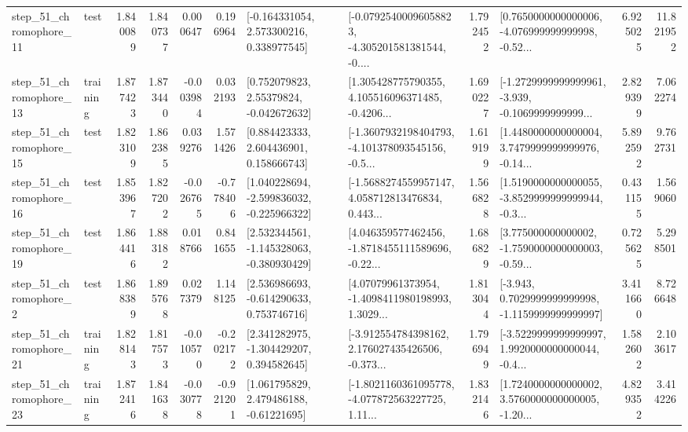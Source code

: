 \begin{tabular}{llrrrrllrlrr}
   step\_51\_chromophore\_11 &      test &      1.840089 &    1.840737 &      0.000647 &  0.196964 &    [-0.164331054, 2.573300216, 0.338977545] &  [-0.07925400096058823, -4.305201581381544, -0.... &       1.792452 &  [0.7650000000000006, -4.076999999999998, -0.52... &            6.925025 &         11.821952 \\
   step\_51\_chromophore\_13 &  training &      1.877423 &    1.873440 &     -0.003984 &  0.032193 &     [0.752079823, 2.55379824, -0.042672632] &  [1.305428775790355, 4.105516096371485, -0.4206... &       1.690227 &  [-1.2729999999999961, -3.939, -0.1069999999999... &            2.829399 &          7.062274 \\
   step\_51\_chromophore\_15 &      test &      1.823109 &    1.862385 &      0.039276 &  1.571426 &     [0.884423333, 2.604436901, 0.158666743] &  [-1.3607932198404793, -4.101378093545156, -0.5... &       1.619199 &  [1.4480000000000004, 3.7479999999999976, -0.14... &            5.892592 &          9.762731 \\
   step\_51\_chromophore\_16 &      test &      1.853967 &    1.827202 &     -0.026765 & -0.778406 &   [1.040228694, -2.599836032, -0.225966322] &  [-1.5688274559957147, 4.058712813476834, 0.443... &       1.566828 &  [1.5190000000000055, -3.8529999999999944, -0.3... &            0.431155 &          1.569060 \\
   step\_51\_chromophore\_19 &      test &      1.864416 &    1.883182 &      0.018766 &  0.841655 &   [2.532344561, -1.145328063, -0.380930429] &  [4.046359577462456, -1.8718455111589696, -0.22... &       1.686829 &  [3.775000000000002, -1.7590000000000003, -0.59... &            0.725625 &          5.298501 \\
    step\_51\_chromophore\_2 &      test &      1.868389 &    1.895768 &      0.027379 &  1.148125 &    [2.536986693, -0.614290633, 0.753746716] &  [4.07079961373954, -1.4098411980198993, 1.3029... &       1.813044 &  [-3.943, 0.7029999999999998, -1.1159999999999997] &            3.411660 &          8.726648 \\
   step\_51\_chromophore\_21 &  training &      1.828143 &    1.817573 &     -0.010570 & -0.202172 &    [2.341282975, -1.304429207, 0.394582645] &  [-3.912554784398162, 2.176027435426506, -0.373... &       1.796949 &  [-3.5229999999999997, 1.9920000000000044, -0.4... &            1.582602 &          2.103617 \\
   step\_51\_chromophore\_23 &  training &      1.872416 &    1.841638 &     -0.030778 & -0.921201 &     [1.061795829, 2.479486188, -0.61221695] &  [-1.8021160361095778, -4.077872563227725, 1.11... &       1.832146 &  [1.7240000000000002, 3.5760000000000005, -1.20... &            4.829352 &          3.414226 \\

\end{tabular}
